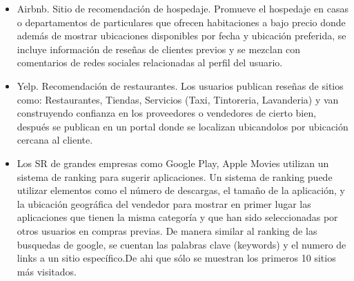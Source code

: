 \begin{itemize}

\item Airbnb. Sitio de recomendación de hospedaje. Promueve el hospedaje en casas o departamentos de particulares que ofrecen habitaciones a bajo precio donde además de mostrar ubicaciones disponibles por fecha y ubicación preferida, se incluye información de reseñas de clientes previos y se mezclan con comentarios de redes sociales relacionadas al perfil del usuario.

\item Yelp. Recomendación de restaurantes. Los usuarios publican reseñas de sitios como: Restaurantes, Tiendas, Servicios (Taxi, Tintoreria, Lavanderia) y van construyendo confianza en los proveedores o vendedores de cierto bien, después se publican en un portal donde se localizan ubicandolos por ubicación cercana al cliente.

\item Los SR de grandes empresas como
Google Play, Apple Movies  utilizan un sistema de ranking para sugerir aplicaciones. Un sistema de ranking puede utilizar elementos como el número de descargas, el tamaño de la aplicación, y la ubicación geográfica del vendedor para mostrar en primer lugar las aplicaciones que tienen la misma categoría y que han sido seleccionadas por otros usuarios en compras previas. De manera similar al ranking de las busquedas de google,  se cuentan las palabras clave (keywords) y el numero de links a un sitio específico.De ahi que sólo se muestran los primeros 10 sitios más visitados. 
\end{itemize}
